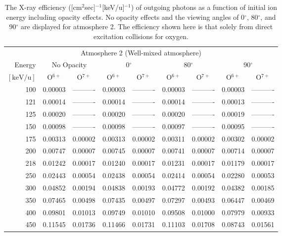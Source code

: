 \begin{table}[ht]
    \centering
    \caption{The X-ray efficiency ([cm$^2$sec]$^{-1}$[keV/u]$^{-1}$) of outgoing photons as a function of initial ion energy including opacity effects. No opacity effects and the viewing angles of 0$^\circ$, 80$^\circ$, and 90$^\circ$ are displayed for atmosphere 2. The efficiency shown here is that solely from direct excitation collisions for oxygen.}
    \begin{tabular}{r|c|c|c|c|c|c|c|c}
    \multicolumn{9}{c}{Atmosphere 2 (Well-mixed atmosphere)} \\ \cline{2-9}
    Energy & \multicolumn{2}{c|}{No Opacity} & \multicolumn{2}{c|}{0$^\circ$} & \multicolumn{2}{c|}{80$^\circ$} & \multicolumn{2}{c}{90$^\circ$} \\ \cline{2-9}
    $\mathrm{[keV/u]}$ & O$^{6+}$ & O$^{7+}$ & O$^{6+}$ & O$^{7+}$ & O$^{6+}$ & O$^{7+}$ & O$^{6+}$ & O$^{7+}$ \\ \cline{1-9}
      100 & 0.00003 & ---------- & 0.00003 & ---------- & 0.00003 & ---------- & 0.00003 & ---------- \\
      121 & 0.00014 & ---------- & 0.00014 & ---------- & 0.00014 & ---------- & 0.00013 & ---------- \\
      125 & 0.00020 & ---------- & 0.00020 & ---------- & 0.00020 & ---------- & 0.00019 & ---------- \\
      150 & 0.00098 & ---------- & 0.00098 & ---------- & 0.00097 & ---------- & 0.00095 & ---------- \\
      175 & 0.00313 & 0.00002 & 0.00313 & 0.00002 & 0.00311 & 0.00002 & 0.00302 & 0.00002 \\
      200 & 0.00747 & 0.00007 & 0.00745 & 0.00007 & 0.00741 & 0.00007 & 0.00714 & 0.00007 \\
      218 & 0.01242 & 0.00017 & 0.01240 & 0.00017 & 0.01231 & 0.00017 & 0.01179 & 0.00017 \\
      250 & 0.02443 & 0.00054 & 0.02438 & 0.00054 & 0.02414 & 0.00054 & 0.02280 & 0.00053 \\
      300 & 0.04852 & 0.00194 & 0.04838 & 0.00193 & 0.04772 & 0.00192 & 0.04382 & 0.00185 \\
      350 & 0.07465 & 0.00498 & 0.07435 & 0.00497 & 0.07297 & 0.00493 & 0.06447 & 0.00469 \\
      400 & 0.09801 & 0.01013 & 0.09749 & 0.01010 & 0.09508 & 0.01000 & 0.07979 & 0.00933 \\
      450 & 0.11545 & 0.01736 & 0.11466 & 0.01731 & 0.11103 & 0.01708 & 0.08743 & 0.01561 \\

\end{tabular}
\end{table}
